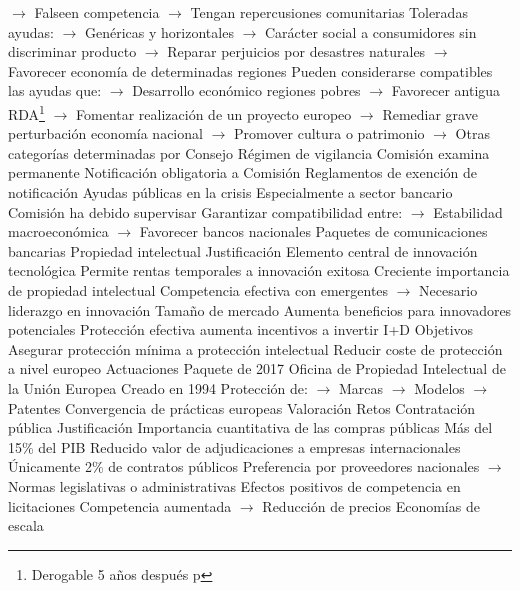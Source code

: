 \documentclass{nuevotema}
\begin{document}
\begin{esquemal}
				\4[] $\to$ Falseen competencia
				\4[] $\to$ Tengan repercusiones comunitarias
				\4 Toleradas ayudas:
				\4[] $\to$ Genéricas y horizontales
				\4[] $\to$ Carácter social a consumidores sin discriminar producto
				\4[] $\to$ Reparar perjuicios por desastres naturales
				\4[] $\to$ Favorecer economía de determinadas regiones
				\4[] Pueden considerarse compatibles las ayudas que:
				\4[] $\to$ Desarrollo económico regiones pobres
				\4[] $\to$ Favorecer antigua RDA\footnote{Derogable 5 años después p}
				\4[] $\to$ Fomentar realización de un proyecto europeo
				\4[] $\to$ Remediar grave perturbación economía nacional
				\4[] $\to$ Promover cultura o patrimonio
				\4[] $\to$ Otras categorías determinadas por Consejo
				\4 Régimen de vigilancia
				\4[] Comisión examina permanente
				\4[] Notificación obligatoria a Comisión
				\4[] Reglamentos de exención de notificación
				\4 Ayudas públicas en la crisis
				\4[] Especialmente a sector bancario
				\4[] Comisión ha debido supervisar
				\4[] Garantizar compatibilidad entre:
				\4[] $\to$ Estabilidad macroeconómica
				\4[] $\to$ Favorecer bancos nacionales
				\4[] Paquetes de comunicaciones bancarias
	\1 
		\2 Propiedad intelectual
			\3 Justificación
				\4 Elemento central de innovación tecnológica
				\4[] Permite rentas temporales a innovación exitosa
				\4 Creciente importancia de propiedad intelectual
				\4[] Competencia efectiva con emergentes
				\4[] $\to$ Necesario liderazgo en innovación
				\4 Tamaño de mercado
				\4[] Aumenta beneficios para innovadores potenciales
				\4[] Protección efectiva aumenta incentivos a invertir I+D
			\3 Objetivos
				\4 Asegurar protección mínima a protección intelectual
				\4 Reducir coste de protección a nivel europeo
			\3 Actuaciones
				\4 Paquete de 2017
				\4 Oficina de Propiedad Intelectual de la Unión Europea
				\4[] Creado en 1994
				\4[] Protección de:
				\4[] $\to$ Marcas
				\4[] $\to$ Modelos
				\4[] $\to$ Patentes
				\4[] Convergencia de prácticas europeas
			\3 Valoración
			\3 Retos
		\2 Contratación pública
			\3 Justificación
				\4 Importancia cuantitativa de las compras públicas
				\4[] Más del 15\% del PIB
				\4 Reducido valor de adjudicaciones a empresas internacionales
				\4[] Únicamente 2\% de contratos públicos
				\4[] Preferencia por proveedores nacionales
				\4[] $\to$ Normas legislativas o administrativas
				\4 Efectos positivos de competencia en licitaciones
				\4[] Competencia aumentada
				\4[] $\to$ Reducción de precios
				\4[] Economías de escala

\end{esquemal}
\end{document}
